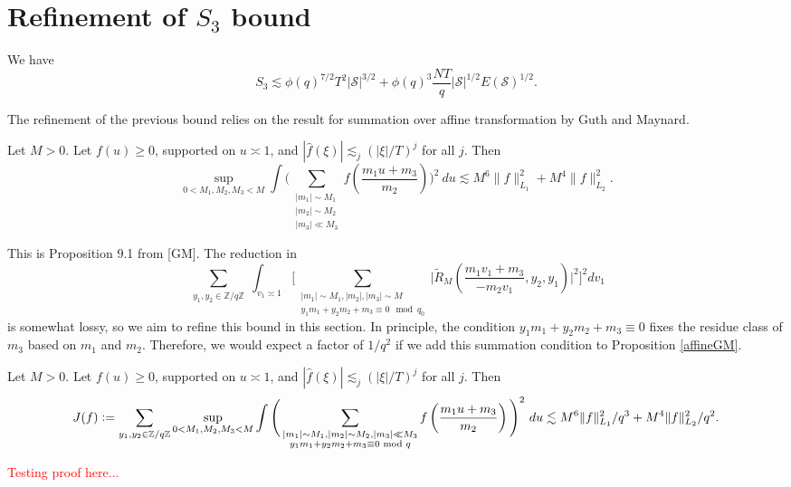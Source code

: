 \section{Refinement of $S_3$ bound}

\begin{proposition}[Refinement of $S_3$]
    \label{refinements_3}
    We have \[
    S_3\lesssim \phi(q)^{7/2}T^2|\mathcal{S}|^{3/2}+\phi(q)^{3}\frac{NT}{q}|\mathcal{S}|^{1/2}E(\mathcal{S})^{1/2}.
     \]
\end{proposition}
The refinement of the previous bound relies on the result for summation over affine transformation by Guth and Maynard.
\begin{lemma} \label{affineGM}
    Let $M>0$. Let $f(u)\geq 0$, supported on $u\asymp 1$, and $|\hat{f}(\xi)|\lesssim_j (|\xi|/T)^j$ for all $j$. Then \[
        \sup_{0<M_1,M_2,M_3<M} \int\Bigg( \sum_{\substack{|m_1|\sim M_1\\|m_2|\sim M_2 \\ |m_3|\ll M_3}} f\left(\frac{m_1 u+m_3}{m_2}\right)\Bigg)^2 \ du \lesssim M^6 \|f\|_{L_1}^2+M^4\|f\|_{L_2}^2.
    \] 
\end{lemma}
This is Proposition 9.1 from [GM]. The reduction in \[
\sum_{\substack{y_1,y_2 \in\mathbb{Z}/q\mathbb{Z} }}\int_{v_1\asymp 1}\Big[\sum_{\substack{|m_1|\sim M_1,|m_2|,|m_3|\sim M\\ y_1m_1+y_2m_2+m_3\equiv 0 \mod q_0}}\Big|\tilde{R}_M\left(\frac{m_1v_1+m_3}{-m_2v_1},y_2,y_1\right)\Big|^2\Big]^2dv_1\]
is somewhat lossy, so we aim to refine this bound in this section.
In principle, the condition $y_1m_1+y_2m_2+m_3\equiv 0$ fixes the residue class of $m_3$ based on $m_1$ and $m_2$. Therefore, we would expect a factor of $1/q^2$ if we add this summation condition to Proposition \ref{affineGM}. 
\begin{lemma}\label{affinetrans}
    Let $M>0$. Let $f(u)\geq 0$, supported on $u\asymp 1$, and $|\hat{f}(\xi)|\lesssim_j (|\xi|/T)^j$ for all $j$. Then \[
        J(f)\mathrel{\mathop:}= \sum_{\substack{y_1,y_2 \in\mathbb{Z}/q\mathbb{Z} }} \sup_{0<M_1,M_2,M_3<M} \int\Bigg( \sum_{\substack{|m_1|\sim M_1,|m_2|\sim M_2 , |m_3|\ll M_3\\ y_1m_1+y_2m_2+m_3\equiv 0 \textrm{ mod } q}} f\left(\frac{m_1 u+m_3}{m_2}\right)\Bigg)^2 \ du \lesssim M^6 \|f\|_{L_1}^2/q^3+M^4\|f\|_{L_2}^2/q^2.
    \] 
\end{lemma}
\textcolor{red}{Testing proof here...}

